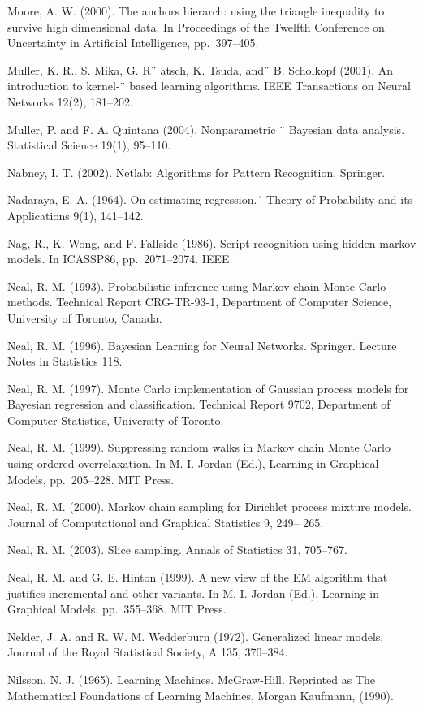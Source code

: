 \documentclass[
  10
]{article}
\begin{document}
Moore, A. W. (2000). The anchors hierarch: using the triangle inequality
to survive high dimensional data. In Proceedings of the Twelfth
Conference on Uncertainty in Artificial Intelligence, pp.~397--405.

Muller, K. R., S. Mika, G. R¨ atsch, K. Tsuda, and¨ B. Scholkopf (2001).
An introduction to kernel-¨ based learning algorithms. IEEE Transactions
on Neural Networks 12(2), 181--202.

Muller, P. and F. A. Quintana (2004). Nonparametric ¨ Bayesian data
analysis. Statistical Science 19(1), 95--110.

Nabney, I. T. (2002). Netlab: Algorithms for Pattern Recognition.
Springer.

Nadaraya, E. A. (1964). On estimating regression.´ Theory of Probability
and its Applications 9(1), 141--142.

Nag, R., K. Wong, and F. Fallside (1986). Script recognition using
hidden markov models. In ICASSP86, pp.~2071--2074. IEEE.

Neal, R. M. (1993). Probabilistic inference using Markov chain Monte
Carlo methods. Technical Report CRG-TR-93-1, Department of Computer
Science, University of Toronto, Canada.

Neal, R. M. (1996). Bayesian Learning for Neural Networks. Springer.
Lecture Notes in Statistics 118.

Neal, R. M. (1997). Monte Carlo implementation of Gaussian process
models for Bayesian regression and classification. Technical Report
9702, Department of Computer Statistics, University of Toronto.

Neal, R. M. (1999). Suppressing random walks in Markov chain Monte Carlo
using ordered overrelaxation. In M. I. Jordan (Ed.), Learning in
Graphical Models, pp.~205--228. MIT Press.

Neal, R. M. (2000). Markov chain sampling for Dirichlet process mixture
models. Journal of Computational and Graphical Statistics 9, 249-- 265.

Neal, R. M. (2003). Slice sampling. Annals of Statistics 31, 705--767.

Neal, R. M. and G. E. Hinton (1999). A new view of the EM algorithm that
justifies incremental and other variants. In M. I. Jordan (Ed.),
Learning in Graphical Models, pp.~355--368. MIT Press.

Nelder, J. A. and R. W. M. Wedderburn (1972). Generalized linear models.
Journal of the Royal Statistical Society, A 135, 370--384.

Nilsson, N. J. (1965). Learning Machines. McGraw-Hill. Reprinted as The
Mathematical Foundations of Learning Machines, Morgan Kaufmann, (1990).
\end{document}
